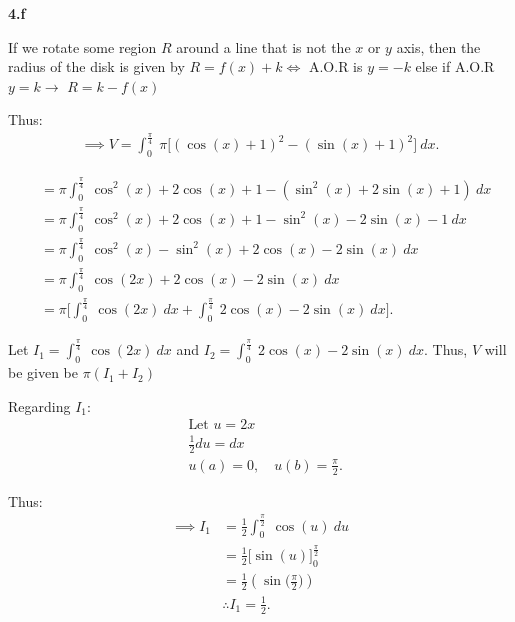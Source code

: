 \documentclass{report}
\begin{document}
    \pagebreak \bigbreak \noindent 
    \textbf{4.f}
    \bigbreak \noindent 
    \begin{minipage}[]{0.47\textwidth}
    \end{minipage}
    \begin{minipage}[]{0.47\textwidth}
    \begin{prop}
        If we rotate some region $R$ around a line that is not the $x$ or $y$ axis, then the radius of the disk is given by $ R =f(x) + k \iff$ A.O.R is $y=-k$ else if A.O.R $y=k \rightarrow$ $R=k-f(x)$
    \end{prop}
    \bigbreak \noindent 
    Thus:
    \begin{align*}
        \implies V = \int_{0}^{\frac{\pi}{4}}\ \pi\bigg[(\cos{(x) + 1})^{2} - (\sin{(x)+1})^{2}\bigg]\ dx 
    .\end{align*}
    \end{minipage}
    \begin{align*}
        &=\pi\int_{0}^{\frac{\pi}{4}}\ \cos^{2}{(x)}+2\cos{(x)}+1 -(\sin^{2}{(x)}+2\sin{(x)} +1)\ dx \\
        &= \pi \int_{0}^{\frac{\pi}{4}}\ \cos^{2}{(x)}+2\cos{(x)}+1 -\sin^{2}{(x)}-2\sin{(x)} -1\ dx  \\
        &=\pi \int_{0}^{\frac{\pi}{4}}\ \cos^{2}{(x)-\sin^{2}{(x)+2\cos{(x)}-2\sin{(x)}}}\ dx \\
        &=\pi \int_{0}^{\frac{\pi}{4}}\ \cos{(2x)}+2\cos{(x)}-2\sin{(x)}\ dx \\
        &=\pi \bigg[\int_{0}^{\frac{\pi}{4}}\ \cos{(2x)}\ dx + \int_{0}^{\frac{\pi}{4}}\ 2\cos{(x)}-2\sin{(x)}\ dx\bigg]
    .\end{align*}
    \bigbreak \noindent 
    \begin{interlude}
       Let $I_{1} = \int_{0}^{\frac{\pi}{4}}\ \cos{(2x)}\ dx $ and $I_{2}=\int_{0}^{\frac{\pi}{4}}\ 2\cos{(x)}-2\sin{(x)}\ dx$. Thus, $V$ will be given be $\pi(I_{1}+I_{2})$
    \end{interlude}
    \begin{minipage}[t]{0.47\textwidth}
        Regarding $I_{1}:$
        \begin{align*}
            &\text{Let $u=2x$} \\
            &\frac{1}{2}du = dx \\
            &u(a) = 0,\quad u(b) = \frac{\pi}{2}
        .\end{align*}
    \end{minipage}
    \begin{minipage}[t]{0.47\textwidth}
        Thus:
        \begin{align*}
            \implies I_{1} &= \frac{1}{2}\int_{0}^{\frac{\pi}{2}}\ \cos{(u)}\ du \\
            &= \frac{1}{2}\bigg[\sin{(u)}\bigg]_0^{\frac{\pi}{2}} \\
            &=\frac{1}{2}(\sin{\bigg(\frac{\pi}{2}\bigg)}) \\
            &\therefore I_{1}=\frac{1}{2}
        .\end{align*}
    \end{minipage}
\end{document}
